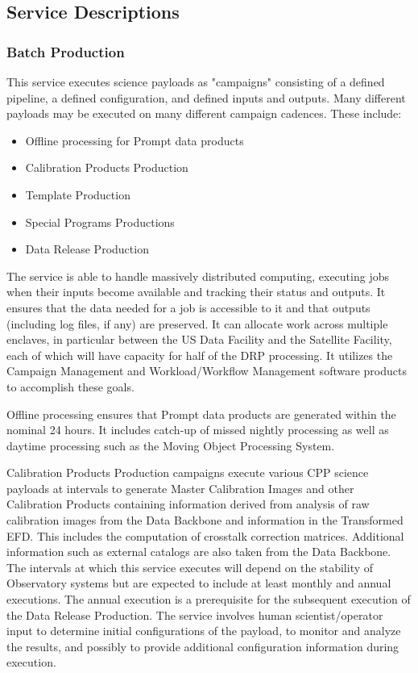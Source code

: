 \documentclass[DM,toc,lsstdraft]{lsstdoc}
\begin{document}
\subsection{Service Descriptions}\label{us-gen-prod-service-descriptions}

\subsubsection{Batch Production}\label{batch-production}

This service executes science payloads as "campaigns" consisting of a defined pipeline, a defined configuration, and defined inputs and outputs.
Many different payloads may be executed on many different campaign cadences.
These include:
\begin{itemize}
	\item Offline processing for Prompt data products
	\item Calibration Products Production
	\item Template Production
	\item Special Programs Productions
	\item Data Release Production
\end{itemize}

The service is able to handle massively distributed computing, executing jobs when their inputs become available and tracking their status and outputs.
It ensures that the data needed for a job is accessible to it and that outputs (including log files, if any) are preserved.
It can allocate work across multiple enclaves, in particular between the US Data Facility and the Satellite Facility, each of which will have capacity for half of the DRP processing.
It utilizes the Campaign Management and Workload/Workflow Management software products to accomplish these goals.

Offline processing ensures that Prompt data products are generated within the nominal 24 hours.
It includes catch-up of missed nightly processing as well as daytime processing such as the Moving Object Processing System.

Calibration Products Production campaigns execute various CPP science payloads at intervals to
generate Master Calibration Images and other Calibration Products
containing information derived from analysis of raw calibration images from
the Data Backbone and information in the Transformed EFD. This includes
the computation of crosstalk correction matrices.
Additional information such as external catalogs are also
taken from the Data Backbone. The intervals at which this service
executes will depend on the stability of Observatory systems but are
expected to include at least monthly and annual executions. The annual
execution is a prerequisite for the subsequent execution of the Data
Release Production. The service involves human scientist/operator input
to determine initial configurations of the payload, to monitor and
analyze the results, and possibly to provide additional configuration
information during execution.
\end{document}
